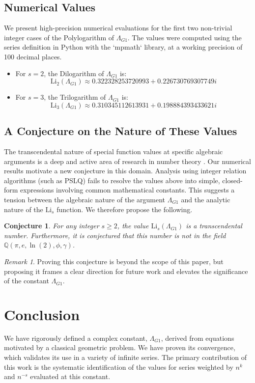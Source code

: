 \documentclass{amsart}
\theoremstyle{plain}
\newtheorem{conjecture}[theorem]{Conjecture}
\theoremstyle{definition}
\theoremstyle{remark}
\newtheorem*{remark}{Remark}
\newcommand{\LambdaG}{\Lambda_{G1}}
\begin{document}
\subsection{Numerical Values}
We present high-precision numerical evaluations for the first two non-trivial integer cases of the Polylogarithm of $\LambdaG$. The values were computed using the series definition in Python with the `mpmath` library, at a working precision of 100 decimal places.
\begin{itemize}
    \item For $s=2$, the Dilogarithm of $\LambdaG$ is:
    $$ \mathrm{Li}_2(\LambdaG) \approx 0.322328253720993 + 0.226730769307749i $$
    \item For $s=3$, the Trilogarithm of $\LambdaG$ is:
    $$ \mathrm{Li}_3(\LambdaG) \approx 0.310345112613931 + 0.198884393433621i $$
\end{itemize}

\subsection{A Conjecture on the Nature of These Values}
The transcendental nature of special function values at specific algebraic arguments is a deep and active area of research in number theory \cite{Lewin}. Our numerical results motivate a new conjecture in this domain. Analysis using integer relation algorithms (such as PSLQ) fails to resolve the values above into simple, closed-form expressions involving common mathematical constants. This suggests a tension between the algebraic nature of the argument $\LambdaG$ and the analytic nature of the $\mathrm{Li}_s$ function. We therefore propose the following.

\begin{conjecture}
For any integer $s \ge 2$, the value $\mathrm{Li}_s(\LambdaG)$ is a transcendental number. Furthermore, it is conjectured that this number is not in the field $\mathbb{Q}(\pi, e, \ln(2), \phi, \gamma)$.
\end{conjecture}
\begin{remark}
Proving this conjecture is beyond the scope of this paper, but proposing it frames a clear direction for future work and elevates the significance of the constant $\LambdaG$.
\end{remark}

\section{Conclusion}
We have rigorously defined a complex constant, $\LambdaG$, derived from equations motivated by a classical geometric problem. We have proven its convergence, which validates its use in a variety of infinite series. The primary contribution of this work is the systematic identification of the values for series weighted by $n^k$ and $n^{-s}$ evaluated at this constant.
\end{document}

